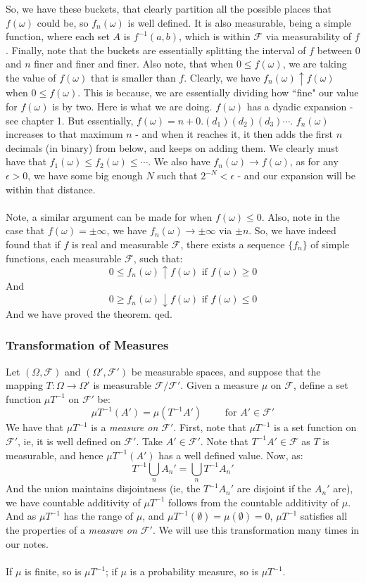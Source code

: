 \documentclass[12pt,a4paper]{article}
\newcommand{\1}[1]{\mathbbm{1}\left\{ #1 \right\}}
\newcommand{\fcal}{\mathcal{F}}
\begin{document}
So, we have these buckets, that clearly partition all the possible places that $f(\omega)$ could be, so $f_n(\omega)$ is well defined. It is also measurable, being a simple function, where each set $A$ is $f^{-1}(a,b)$, which is within $\fcal$ via measurability of $f$. Finally, note that the buckets are essentially splitting the interval of $f$ between $0$ and $n$ finer and finer and finer. Also note, that when $0 \leq f(\omega)$, we are taking the value of $f(\omega)$ that is smaller than $f$. Clearly, we have $f_n(\omega) \uparrow f(\omega)$ when $0 \leq f(\omega)$. This is because, we are essentially dividing how ``fine" our value for $f(\omega)$ is by two. Here is what we are doing. $f(\omega)$ has a dyadic expansion - see chapter 1. But essentially, $f(\omega) = n + 0.(d_1)(d_2)(d_3)\cdots$. $f_n(\omega)$ increases to that maximum $n$ - and when it reaches it, it then adds the first $n$ decimals (in binary) from below, and keeps on adding them. We clearly must have that $f_1(\omega) \leq f_2(\omega) \leq \cdots$. We also have $f_n(\omega) \to f(\omega)$, as for any $\epsilon > 0$, we have some big enough $N$ such that $2^{-N} < \epsilon$ - and our expansion will be within that distance.
\\\\
Note, a similar argument can be made for when $f(\omega) \leq 0$. Also, note in the case that $f(\omega) = \pm \infty$, we have $f_n(\omega) \to \pm \infty$ via $\pm n$. So, we have indeed found that if $f$ is real and measurable $\fcal$, there exists a sequence $\{f_n\}$ of simple functions, each measurable $\fcal$, such that:
$$
	0 \leq f_n(\omega) \uparrow f(\omega) \text{ if $f(\omega) \geq 0$}
$$
And
$$
	0 \geq f_n(\omega) \downarrow f(\omega) \text{ if $f(\omega) \leq 0$}
$$
And we have proved the theorem. qed.

\subsubsection{Transformation of Measures}
Let $(\Omega,\fcal)$ and $(\Omega',\fcal')$ be measurable spaces, and suppose that the mapping $T: \Omega \to \Omega'$ is measurable $\fcal/\fcal'$. Given a measure $\mu$ on $\fcal$, define a set function $\mu T^{-1}$ on $\fcal'$ be:
$$
	\mu T^{-1}(A') = \mu(T^{-1}A') \quad\quad\text{ for $A' \in \fcal'$}
$$
We have that $\mu T^{-1}$ is a \textit{measure on $\fcal'$}. First, note that $\mu T^{-1}$ is a set function on $\fcal'$, ie, it is well defined on $\fcal'$. Take $A' \in \fcal'$. Note that $T^{-1}A' \in \fcal$ as $T$ is measurable, and hence $\mu T^{-1}(A')$ has a well defined value. Now, as:
$$
	T^{-1}\bigcup_n A_n' = \bigcup_n T^{-1} A_n'
$$
And the union maintains disjointness (ie, the $T^{-1} A_n'$ are disjoint if the $A_n'$ are), we have countable additivity of $\mu T^{-1}$ follows from the countable additivity of $\mu$. And as $\mu T^{-1}$ has the range of $\mu$, and $\mu T^{-1}(\emptyset) = \mu(\emptyset) = 0$, $\mu T^{-1}$ satisfies all the properties of a \textit{measure on $\fcal'$}. We will use this transformation many times in our notes.
\\\\
If $\mu$ is finite, so is $\mu T^{-1}$; if $\mu$ is a probability measure, so is $\mu T^{-1}$.
\end{document}
